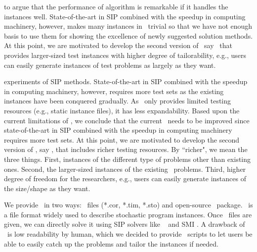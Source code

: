 to argue that the performance of algorithm is remarkable if it handles the instances well. 
State-of-the-art in SIP combined with the speedup in computing machinery, however, makes many 
instances in \siplib\ trivial so that we have not enough basis to use them for showing the 
excellence of newly suggested solution methods. At this point, we are motivated to develop 
the second version of \siplib\, say \siplibtwo\ that provides larger-sized test instances 
with higher degree of tailorability, e.g., users can easily generate instances of test 
problems as largely as they want.%

experiments of SIP methods. State-of-the-art in SIP combined with the speedup in computing 
machinery, however, requires more test sets as the existing instances have been conquered 
gradually. As \siplib\ only provides limited testing resources (e.g., static instance files), 
it has less expandability. 
Based upon the current limitations of \siplib, we conclude that the current \siplib\ needs to 
be improved since state-of-the-art in SIP combined with the speedup in computing machinery 
requires more test sets. At this point, we are motivated to develop the second version of 
\siplib, say \siplibtwo, that includes richer testing resources. By ``richer", we mean the 
three things. First, instances of the different type of problems other than existing ones. 
Second, the larger-sized instances of the existing \siplib\ problems. Third, higher degree of 
freedom for the researchers, e.g., users can easily generate instances of the size/shape as 
they want.

We provide \siplibtwo\ in two ways: \smps\ files (*.cor, *.tim, *.sto) and open-source 
\julia\ package. \smps\ is a file format widely used to describe stochastic program 
instances. Once \smps\ files are given, we can directly solve it using SIP solvers like \dsp\ 
\cite{journal:KZ2015} and \textsf{SMI} \cite{web:SMI}. A drawback of \smps\ is low 
readability by human, which we decided to provide \julia\ scripts to let users be able to 
easily catch up the problems and tailor the instances if needed.


